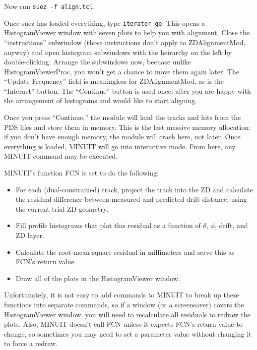 \documentclass[12pt]{article}
\begin{document}
Now run {\tt suez -f align.tcl}.

Once suez has loaded everything, type {\tt iterator go}.  This opens a
HistogramViewer window with seven plots to help you with alignment.
Close the ``instructions'' subwindow (those instructions don't apply
to ZDAlignmentMod, anyway) and open histogram subwindows with the
heirarchy on the left by double-clicking.  Arrange the subwindows now,
becuase unlike HistogramViewerProc, you won't get a chance to move
them again later.  The ``Update Frequency'' field is meaningless for
ZDAlignmentMod, as is the ``Interact'' button.  The ``Continue''
button is used once: after you are happy with the arrangement of
histograms and would like to start aligning.

Once you press ``Continue,'' the module will load the tracks and hits
from the PDS files and store them in memory.  This is the last massive
memory allocation: if you don't have enough memory, the module will
crash here, not later.  Once everything is loaded, MINUIT will go into
interactive mode.  From here, any MINUIT command may be executed.

MINUIT's function FCN is set to do the following:
\begin{itemize}

  \item For each (dual-constrained) track, project the track into the
  ZD and calculate the residual difference between measured and
  predicted drift distance, using the current trial ZD geometry.

  \item Fill profile histograms that plot this residual as a function
  of $\theta$, $\phi$, drift, and ZD layer.

  \item Calculate the root-mean-square residual in millimeters and
  serve this as FCN's return value.

  \item Draw all of the plots in the HistogramViewer window.

\end{itemize}
Unfortunately, it is not easy to add commands to MINUIT to break up
these functions into separate commands, so if a window (or a
screensaver) covers the HistogramViewer window, you will need to
recalculate all residuals to redraw the plots.  Also, MINUIT doesn't
call FCN unless it expects FCN's return value to change, so sometimes
you may need to set a parameter value without changing it to force a
redraw.
\end{document}
